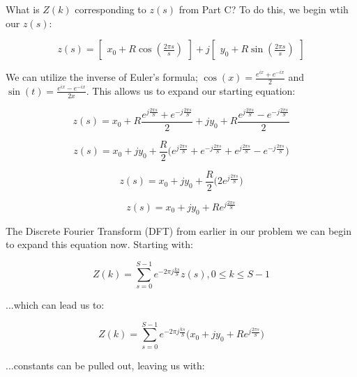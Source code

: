 \documentclass{article}
\begin{document}
What is $Z(k)$ corresponding to $z(s)$ from Part C? To do this, we begin wtih our $z(s)$:

\begin{equation}
    z(s)=\begin{bmatrix}x_0 + R\cos(\frac{2\pi s}{s})\end{bmatrix}+j\begin{bmatrix}y_0 + R \sin(\frac{2\pi s}{s})\end{bmatrix}
\end{equation}

We can utilize the inverse of Euler's formula; $\cos(x)=\frac{e^{ix}+e^{-ix}}{2}$ and $\sin(t) = \frac{e^{ix}-e^{-ix}}{2x}$. This allows us to expand our starting equation:

\begin{equation}
    z(s)= x_0 + R\frac{e^{j\frac{2\pi s}{S}} + e^{-j\frac{2\pi s}{S}}}{2} + jy_0 + R\frac{e^{j\frac{2\pi s}{S}}-e^{-j\frac{2\pi s}{S}}}{2}
\end{equation}

\begin{equation}
    z(s) = x_0 + jy_0 + \frac{R}{2} \bigl(e^{j\frac{2\pi s}{S}} + e^{-j\frac{2\pi s}{S}} + e^{j\frac{2\pi s}{S}} - e^{-j\frac{2\pi s}{S}}\bigr)
\end{equation}

\begin{equation}
    z(s)= x_0 + jy_0 + \frac{R}{2} \bigl( 2e^{j\frac{2\pi s}{S}} \bigr)
\end{equation}

\begin{equation}
    z(s)= x_0 + jy_0 + Re^{j\frac{2\pi s}{S}}
\end{equation}

\noindent The Discrete Fourier Transform (DFT) from earlier in our problem we can begin to expand this equation now. Starting with:

\begin{equation}
    Z(k) = \sum^{S-1}_{s=0} e^{-2\pi j \frac{ks}{S}} z(s), 0\leq k \leq S-1
\end{equation}

\noindent ...which can lead us to:

\begin{equation}
    Z(k) = \sum^{S-1}_{s=0} e^{-2\pi j \frac{ks}{S}} \bigl( x_0 + jy_0 + Re^{j\frac{2\pi s}{S}} \bigr)
\end{equation}

\noindent ...constants can be pulled out, leaving us with:
\end{document}
